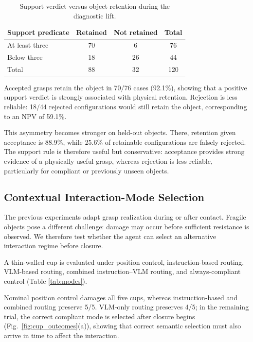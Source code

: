 \documentclass[letterpaper,10pt,conference]{ieeeconf}
\begin{document}
\begin{table}[t]
\caption{Support verdict versus object retention during the diagnostic lift.}
\label{tab:retention_audit}
\centering\small
\setlength{\tabcolsep}{3pt}
\begin{tabularx}{\columnwidth}{Yccc}
\toprule
Support predicate & Retained & Not retained & Total\\
\midrule
At least three & 70 & 6  & 76\\
Below three    & 18 & 26 & 44\\
\midrule
Total          & 88 & 32 & 120\\
\bottomrule
\end{tabularx}
\vspace{-6mm}
\end{table}

Accepted grasps retain the object in 70/76 cases (92.1\%), showing that a
positive support verdict is strongly associated with physical retention.
Rejection is less reliable: 18/44 rejected configurations would still retain
the object, corresponding to an NPV of 59.1\%.

This asymmetry becomes stronger on held-out objects. There, retention given
acceptance is 88.9\%, while 25.6\% of retainable configurations are falsely
rejected. The support rule is therefore useful but conservative: acceptance
provides strong evidence of a physically useful grasp, whereas rejection is
less reliable, particularly for compliant or previously unseen objects.


\subsection{Contextual Interaction-Mode Selection}
\label{sec:cup}

The previous experiments adapt grasp realization during or after contact.
Fragile objects pose a different challenge: damage may occur before sufficient
resistance is observed. We therefore test whether the agent can select an
alternative interaction regime before closure.

A thin-walled cup is evaluated under position control, instruction-based
routing, VLM-based routing, combined instruction--VLM routing, and
always-compliant control (Table \ref{tab:modes}).

Nominal position control damages all five cups, whereas instruction-based and
combined routing preserve 5/5. VLM-only routing preserves 4/5; in the remaining
trial, the correct compliant mode is selected after closure begins
(Fig.~\ref{fig:cup_outcomes}(a)), showing that correct semantic selection must
also arrive in time to affect the interaction.
\end{document}
